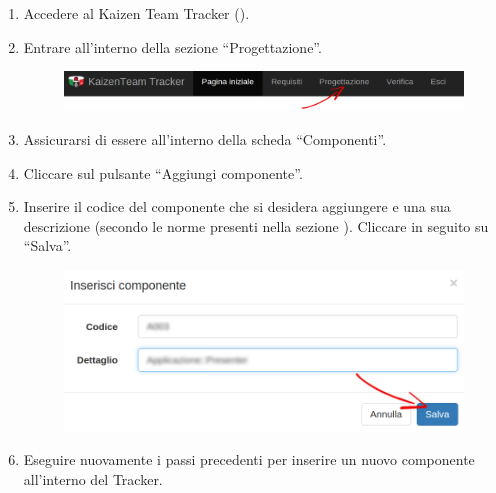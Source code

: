 					\begin{enumerate}
						\item Accedere al Kaizen Team Tracker ().
						\item Entrare all'interno della sezione “Progettazione”.
						\begin{figure}[H]
							\centering
							\includegraphics[width=\textwidth]{Pics/HomePageMenuFrecciaProg}
						\end{figure}
						\item Assicurarsi di essere all'interno della scheda “Componenti”.
						\item Cliccare sul pulsante “Aggiungi componente”.
						\item Inserire il codice del componente che si desidera aggiungere e una sua descrizione (secondo le norme presenti nella sezione ). Cliccare in seguito su “Salva”.
						\begin{figure}[H]
							\centering
							\includegraphics[width=\textwidth]{Pics/InserireComponente}
						\end{figure}
						\item Eseguire nuovamente i passi precedenti per inserire un nuovo componente all'interno del Tracker.
					\end{enumerate}

